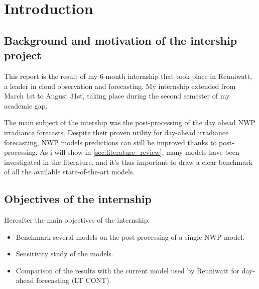 \section{Introduction}
\subsection{Background and motivation of the intership project}
This report is the result of my 6-month internship that took place in Reuniwatt, a leader in cloud observation and forecasting.
My internship extended from March 1st to August 31st, taking place during the second semester of my academic gap.

The main subject of the intership was the post-processing of the day ahead NWP irradiance forecasts.
Despite their proven utility for day-ahead irradiance forecasting, NWP models predictions can still be improved thanks to post-processing.
As i will show in \ref{sec:literature_review}, many models have been investigated in the literature, and it's thus important to draw a clear benchmark
of all the available state-of-the-art models.
\subsection{Objectives of the internship}
Hereafter the main objectives of the internship:
\begin{itemize}
    \item  Benchmark several models on the post-processing of a single NWP model.
    \item Sensitivity study of the models.
    \item Comparison of the results with the current model used by Reuniwatt for day-ahead forecasting (LT CONT).
\end{itemize}